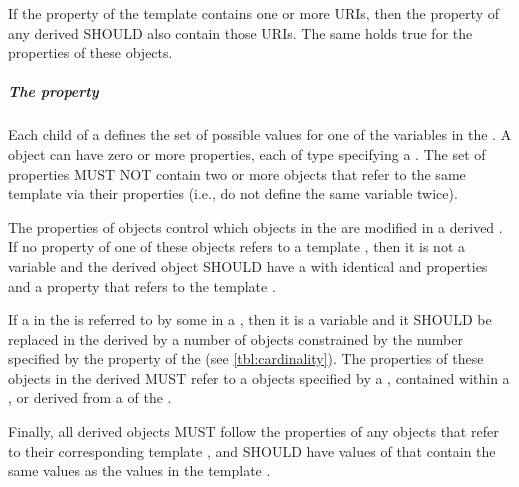 If the  property of the template  contains one or more URIs, then the  property of any derived  SHOULD also contain those URIs. 
The same holds true for the  properties of these  objects.

\subparagraph{The  property}\label{sec:hasVariableComponent}

Each  child of a  defines the set of possible values for one of the variables in the .
A  object can have zero or more  properties, each of type  specifying a . 
The set of   properties MUST NOT contain two or more  objects that refer to the same template  via their  properties (i.e., do not define the same variable twice).

The  properties of  objects control which  objects in the  are modified in a derived .
If no  property of one of these  objects refers to a template , then it is not a variable and the derived object SHOULD have a  with identical  and  properties
and a  property that refers to the template .

If a  in the  is referred to by some  in a , then it is a variable and it SHOULD be replaced in the derived  by a number of  objects constrained by the number specified by the  property of the  (see \ref{tbl:cardinality}).
The  properties of these  objects in the derived  MUST refer to a  objects specified by a , contained within a , or derived from a  of the .


Finally, all derived  objects MUST follow the  properties of any 
 objects that refer to their corresponding template , and SHOULD have values of  that contain the same values as the values  in the template .


